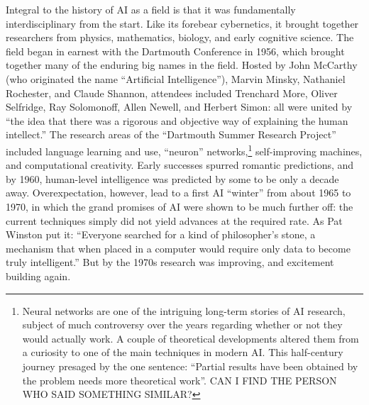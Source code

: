 Integral to the history of AI as a field is that it was fundamentally
interdisciplinary from the start. Like its forebear cybernetics, it
brought together researchers from physics, mathematics, biology, and
early cognitive science. The field began in earnest with the Dartmouth
Conference in 1956, which brought together many of the enduring big
names in the field. Hosted by John McCarthy (who originated the name
``Artificial Intelligence''), Marvin Minsky, Nathaniel Rochester, and
Claude Shannon, attendees included Trenchard More, Oliver Selfridge,
Ray Solomonoff, Allen Newell, and Herbert Simon: all were united by
``the idea that there was a rigorous and objective way of explaining
the human intellect.''\cite[Ch. 5]{mccorduck} The research areas of
the ``Dartmouth Summer Research Project'' included language learning
and use, ``neuron'' networks,\footnote{Neural networks are one of the
  intriguing long-term stories of AI research, subject of much
  controversy over the years regarding whether or not they would
  actually work. A couple of theoretical developments altered them
  from a curiosity to one of the main techniques in modern AI. This
  half-century journey presaged by the one sentence: ``Partial
  results have been obtained by the problem needs more theoretical
  work''.\cite{dartmouthconf} CAN I FIND THE PERSON WHO SAID SOMETHING
SIMILAR?} self-improving machines, and computational 
creativity.\cite{dartmouthconf} Early successes spurred romantic
predictions, and by 1960, human-level intelligence was predicted by
some to be only a decade away.\cite[p. 3]{winston} Overexpectation, however,
lead to a first AI ``winter'' from about 1965 to 1970, in which the
grand promises of AI were shown to be much further off: the current
techniques simply did not yield advances at the required rate. As Pat
Winston put it: ``Everyone searched for a kind of philosopher's stone,
a mechanism that when placed in a computer would require only data to
become truly intelligent.''\cite[p. 4]{winston} But by the 1970s
research was improving, and excitement building again.


